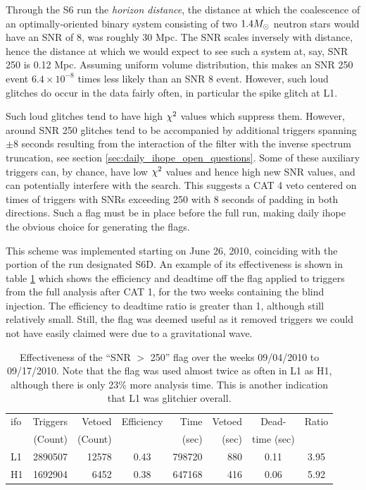 
Through the S6 run the \emph{horizon distance}, the distance at which
the coalescence of an optimally-oriented binary system consisting of
two $1.4 M_\odot$ neutron stars would have an SNR of 8, was roughly 30
Mpc.  The SNR scales inversely with distance, hence the distance at
which we would expect to see such a system at, say, SNR 250 is 0.12
Mpc.  Assuming uniform volume distribution, this makes an SNR 250
event $6.4 \times 10^{-8}$ times less likely than an SNR 8 event.  
However, such loud glitches do occur in the data fairly often,
in particular the spike glitch at L1.

Such loud glitches tend to have high $\chi^2$ values which suppress
them.  However, around SNR 250 glitches tend to be accompanied by
additional triggers spanning $\pm 8$ seconds resulting from the
interaction of the filter with the inverse spectrum truncation, see
section \ref{sec:daily_ihope_open_questions}.  Some of these auxiliary
triggers can, by chance, have low $\chi^2$ values and hence high new
SNR values, and can potentially interfere with the search.  This
suggests a CAT 4 veto centered on times of triggers with SNRs
exceeding 250 with 8 seconds of padding in both directions.  Such a
flag must be in place before the full run, making daily ihope the
obvious choice for generating the flags.

This scheme was implemented starting on June 26, 2010, coinciding with
the portion of the run designated S6D.  An example of its
effectiveness is shown in table \ref{tab:daily_ihope_loud_flag} which
shows the efficiency and deadtime off the flag applied to triggers
from the full analysis after CAT 1, for the two weeks containing the
blind injection.  The efficiency to deadtime ratio is greater than 1,
although still relatively small.  Still, the flag was deemed useful as
it removed triggers we could not have easily claimed were due to a
gravitational wave.

\begin{table}
\begin{center}
\begin{tabular}{lrrcrrcc}
\hline
ifo & Triggers & Vetoed & Efficiency & Time
& Vetoed & Dead-  & Ratio \\
 & (Count) & (Count) &  & (sec) & (sec) & time (sec) &  \\
\hline
L1  & 2890507 & 12578 & 0.43 & 798720 & 880 & 0.11 & 3.95 \\
H1  & 1692904 &  6452 & 0.38 & 647168 & 416 & 0.06 & 5.92 \\
\end{tabular}
  \caption[Effectiveness of the ``SNR $>$ 250'' flag]{
  \label{tab:daily_ihope_loud_flag}
Effectiveness of the ``SNR $>$ 250'' flag over the weeks
09/04/2010  to 09/17/2010.  Note that the flag was used almost twice
as often in L1 as H1, although there is only 23\% more analysis time.
This is another indication that L1 was glitchier overall.}
\end{center}
\end{table}




